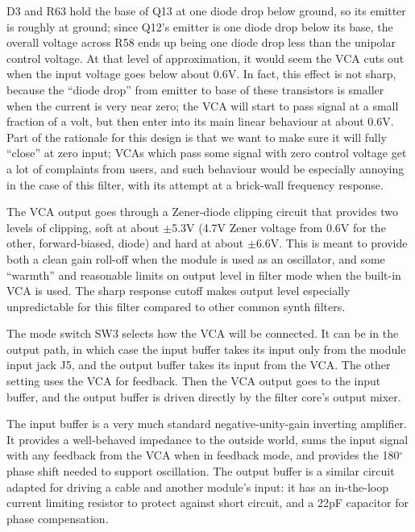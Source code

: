 D3 and R63 hold the base of Q13 at one diode drop below ground, so its
emitter is roughly at ground; since Q12's emitter is one diode drop below
its base, the overall voltage across R58 ends up being one diode drop less
than the unipolar control voltage.  At that level of approximation, it would
seem the VCA cuts out when the input voltage goes below about 0.6V.  In
fact, this effect is not sharp, because the ``diode drop'' from emitter to
base of these transistors is smaller when the current is very near zero; the
VCA will start to pass signal at a small fraction of a volt, but then enter
into its main linear behaviour at about 0.6V.  Part of the rationale for
this design is that we want to make sure it will fully ``close'' at zero
input; VCAs which pass some signal with zero control voltage get a lot of
complaints from users, and such behaviour would be especially annoying in
the case of this filter, with its attempt at a brick-wall frequency
response.

The VCA output goes through a Zener-diode clipping circuit that provides two
levels of clipping, soft at about $\pm$5.3V (4.7V Zener voltage from 0.6V
for the other, forward-biased, diode) and hard at about $\pm$6.6V.  This is
meant to provide both a clean gain roll-off when the module is
used as an oscillator, and some ``warmth'' and reasonable limits on output
level in filter mode when the built-in VCA is used.  The sharp response
cutoff makes output level especially unpredictable for this filter compared
to other common synth filters.

The mode switch SW3 selects how the VCA will be connected.  It can be in the
output path, in which case the input buffer takes its input only from the
module input jack J5, and the output buffer takes its input from the VCA. 
The other setting uses the VCA for feedback.  Then the VCA output goes to
the input buffer, and the output buffer is driven directly by the filter
core's output mixer.

The input buffer is a very much standard negative-unity-gain inverting
amplifier.  It provides a well-behaved impedance to the outside world, sums
the input signal with any feedback from the VCA when in feedback mode, and
provides the 180$^\circ$ phase shift needed to support oscillation.  The
output buffer is a similar circuit adapted for driving a cable and
another module's input: it has an in-the-loop current limiting resistor to
protect against short circuit, and a 22pF capacitor for phase compensation.


